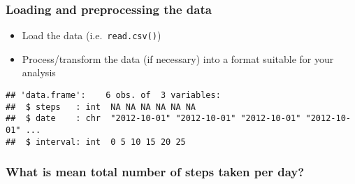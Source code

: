 \documentclass[
]{article}
\newenvironment{Shaded}{\begin{snugshade}}{\end{snugshade}}
\newcommand{\CommentTok}[1]{\textcolor[rgb]{0.56,0.35,0.01}{\textit{#1}}}
\newcommand{\DataTypeTok}[1]{\textcolor[rgb]{0.13,0.29,0.53}{#1}}
\newcommand{\KeywordTok}[1]{\textcolor[rgb]{0.13,0.29,0.53}{\textbf{#1}}}
\newcommand{\NormalTok}[1]{#1}
\newcommand{\OtherTok}[1]{\textcolor[rgb]{0.56,0.35,0.01}{#1}}
\newcommand{\StringTok}[1]{\textcolor[rgb]{0.31,0.60,0.02}{#1}}
\providecommand{\tightlist}{%
  \setlength{\itemsep}{0pt}\setlength{\parskip}{0pt}}
\begin{document}
\hypertarget{loading-and-preprocessing-the-data}{%
\subsubsection{Loading and preprocessing the
data}\label{loading-and-preprocessing-the-data}}

\begin{itemize}
\tightlist
\item
  Load the data (i.e.~\color{red}{\verb|read.csv()|}\texttt{read.csv()})
\item
  Process/transform the data (if necessary) into a format suitable for
  your analysis
\end{itemize}

\begin{Shaded}
\end{Shaded}

\begin{verbatim}
## 'data.frame':    6 obs. of  3 variables:
##  $ steps   : int  NA NA NA NA NA NA
##  $ date    : chr  "2012-10-01" "2012-10-01" "2012-10-01" "2012-10-01" ...
##  $ interval: int  0 5 10 15 20 25
\end{verbatim}

\hypertarget{what-is-mean-total-number-of-steps-taken-per-day}{%
\subsubsection{What is mean total number of steps taken per
day?}\label{what-is-mean-total-number-of-steps-taken-per-day}}
\end{document}
